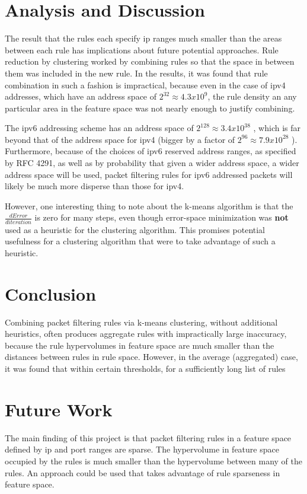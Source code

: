\documentclass[11pt,letterpaper]{article}
\begin{document}
\section{Analysis and Discussion}
The result that the rules each specify ip ranges much smaller than the areas between each rule has implications about future potential approaches. Rule reduction by clustering worked by combining rules so that the space in between them was included in the new rule. In the results, it was found that rule combination in such a fashion is impractical, because even in the case of ipv4 addresses, which have an address space of $2^{32}\approx 4.3x 10^9$, the rule density an any particular area in the feature space was not nearly enough to justify combining.

The ipv6 addressing scheme has an address space of $2^{128} \approx 3.4x10^{38}$ , which is far beyond that of the address space for ipv4 (bigger by a factor of $2^{96} \approx 7.9x10^{28}$ ). Furthermore, because of the choices of ipv6 reserved address ranges, as specified by RFC 4291, as well as by probability that given a wider address space, a wider address space will be used, packet filtering rules for ipv6 addressed packets will likely be much more disperse than those for ipv4. 

However, one interesting thing to note about the k-means algorithm is that the $\frac{d Error}{d iteration}$ is zero for many steps, even though error-space minimization was {\bf not} used as a heuristic for the clustering algorithm. This promises potential usefulness for a clustering algorithm that were to take advantage of such a heuristic. 

\section{Conclusion}
Combining packet filtering rules via k-means clustering, without additional heuristics, often produces aggregate rules with impractically large inaccuracy, because the rule hypervolumes in feature space are much smaller than the distances between rules in rule space. However, in the average (aggregated) case, it was found that within certain thresholds, for a sufficiently long list of rules


\section{Future Work}
The main finding of this project is that packet filtering rules in a feature space defined by ip and port ranges are sparse. The hypervolume in feature space occupied by the rules is much smaller than the hypervolume between many of the rules. An approach could be used that takes advantage of rule sparseness in feature space.
\end{document}
